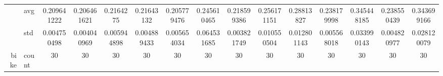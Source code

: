 \begin{table}[H]
{\begin{tabular}{rlccc|c|c|c|c|c|ccccc}
			                                                                               & avg                & \cellcolor[rgb]{ .459,  .765,  .486}0.209641222                                & \cellcolor[rgb]{ .4,  .745,  .482}0.206461621                                  & \cellcolor[rgb]{ .588,  .8,  .49}0.2164275                                     & \cellcolor[rgb]{ .588,  .8,  .49}0.21643132     & \cellcolor[rgb]{ .388,  .745,  .482}\textcolor[rgb]{ 0,  .38,  0}{0.205779476} & \cellcolor[rgb]{ 1,  .886,  .514}0.245610465    & \cellcolor[rgb]{ .627,  .812,  .494}0.218599386                                & \cellcolor[rgb]{ .996,  .839,  .502}0.256171151 & \cellcolor[rgb]{ .988,  .686,  .475}0.28813827  & \cellcolor[rgb]{ 1,  .922,  .518}0.238179998    & \cellcolor[rgb]{ .973,  .412,  .42}0.345448185  & \cellcolor[rgb]{ 1,  .922,  .518}0.238550439    & \cellcolor[rgb]{ .976,  .424,  .424}0.343699166 \\
			                                                                               & std                & 0.004750498                                                                    & 0.004040969                                                                    & 0.005944898                                                                    & 0.004889433                                     & 0.005654034                                                                    & 0.064531685                                     & 0.003821749                                                                    & 0.010550504                                     & 0.012801143                                     & 0.005568018                                     & 0.033990143                                     & 0.004820977                                     & 0.028120079                                     \\
			bike                                                                           & count              & 30                                                                             & 30                                                                             & 30                                                                             & 30                                              & 30                                                                             & 30                                              & 30                                                                             & 30                                              & 30                                              & 30                                              & 30                                              & 30                                              & 30                                              \\

\end{tabular}}
\end{table}
